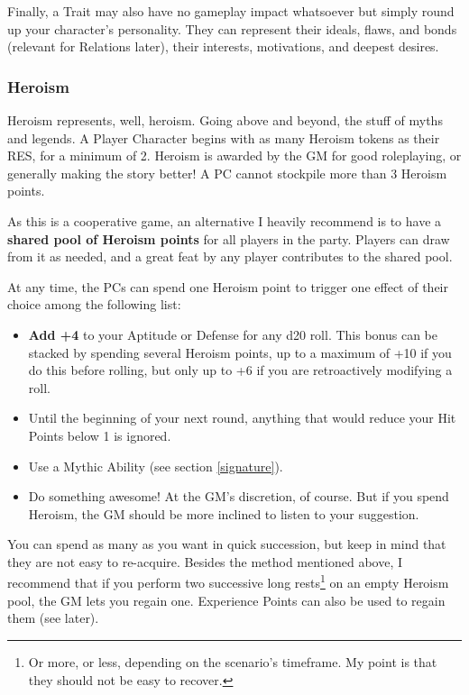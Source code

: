 Finally, a Trait may also have no gameplay impact whatsoever but simply round up your character's personality. They can represent their ideals, flaws, and bonds (relevant for Relations later), their interests, motivations, and deepest desires.

\subsubsection{Heroism}

\label{heroism}

Heroism represents, well, heroism. Going above and beyond, the stuff of myths and legends. A Player Character begins with as many Heroism tokens as their RES, for a minimum of 2. Heroism is awarded by the GM for good roleplaying, or generally making the story better! A PC cannot stockpile more than 3 Heroism points. 

As this is a cooperative game, an alternative I heavily recommend is to have a \textbf{shared pool of Heroism points} for all players in the party. Players can draw from it as needed, and a great feat by any player contributes to the shared pool.

At any time, the PCs can spend one Heroism point to trigger one effect of their choice among the following list:

\begin{itemize}
    \item \textbf{Add +4} to your Aptitude or Defense for any d20 roll. This bonus can be stacked by spending several Heroism points, up to a maximum of +10 if you do this before rolling, but only up to +6 if you are retroactively modifying a roll.
    \item Until the beginning of your next round, anything that would reduce your Hit Points below 1 is ignored.
    \item Use a Mythic Ability (see section \ref{signature}).
    \item Do something awesome! At the GM's discretion, of course. But if you spend Heroism, the GM should be more inclined to listen to your suggestion.
\end{itemize}

You can spend as many as you want in quick succession, but keep in mind that they are not easy to re-acquire. Besides the method mentioned above, I recommend that if you perform two successive long rests\footnote{Or more, or less, depending on the scenario's timeframe. My point is that they should not be easy to recover.} on an empty Heroism pool, the GM lets you regain one. Experience Points can also be used to regain them (see later).

